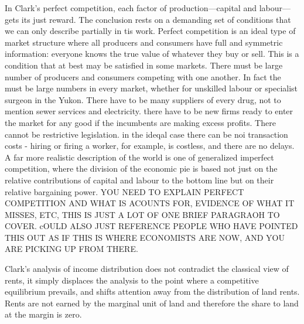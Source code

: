  In Clark's  perfect competition,%
 each factor of production—capital and labour—gets its just reward. The conclusion rests on a demanding set of conditions that we can only describe partially in tis work. Perfect competition is an ideal type of market structure where all producers and consumers have full and symmetric information: everyone knows the true value of whatever they buy or sell.  This is a condition that at best may be satisfied in some markets. There must be large number of producers and consumers competing with one another. In fact the must be large numbers in every market, whether for unskilled labour or specialist surgeon in the Yukon.  There have to be many suppliers of every drug, not to mention sewer services and electricity. there have to be new firms ready to enter the market  for any good  if the incumbents are making excess profits. There cannot be restrictive legislation. in the ideqal case there can be noi transaction costs - hiring or firing a worker, for example,  is costless,  and there are no delays.  %
 A far more realistic description of the world is one of generalized  \gls{imperfect competition}, where the division of the economic pie is based not just on the relative contributions of capital and labour to the bottom line but on their relative bargaining power.  %
 YOU NEED TO EXPLAIN PERFECT COMPETITION AND WHAT IS ACOUNTS FOR, EVIDENCE OF WHAT IT MISSES, ETC, THIS IS JUST A LOT OF ONE BRIEF PARAGRAOH TO COVER. cOULD ALSO JUST REFERENCE PEOPLE WHO HAVE POINTED THIS OUT AS IF THIS IS WHERE ECONOMISTS ARE NOW, AND YOU ARE PICKING UP FROM THERE. 
 
Clark's analysis of income distribution does not contradict the classical view of rents, it simply displaces the analysis to the point where a competitive equilibrium prevails, and shifts attention away from the distribution of land rents. Rents are not earned by the marginal unit of land and therefore the share to land at the margin is zero. 


